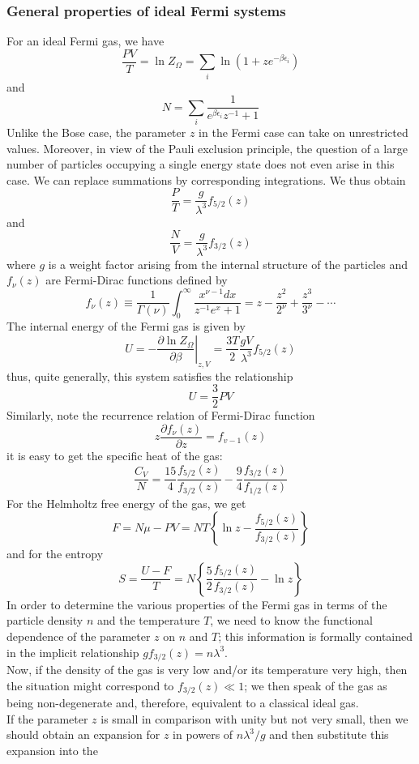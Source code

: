 \documentclass[cyan]{elegantnote}
\begin{document}
\subsubsection{General properties of ideal Fermi systems}
For an ideal Fermi gas, we have
\[\frac{PV}{T} = \ln Z_{\Omega} = \sum_i \ln(1+ze^{-\beta\epsilon_i})\]
and
\[N = \sum_i \frac{1}{e^{\beta\epsilon_i}z^{-1} + 1}\]
Unlike the Bose case, the parameter $z$ in the Fermi case can take on unrestricted values. Moreover, in view of the Pauli exclusion principle, the question of a large number of particles occupying a single energy state does not even arise in this case.  We can replace summations by corresponding integrations. We thus obtain
\[\frac{P}{T} = \frac{g}{\lambda^3}f_{5/2}(z)\]
and
\[\frac{N}{V} =  \frac{g}{\lambda^3}f_{3/2}(z)\]
where $g$ is a weight factor arising from the internal structure of the particles and $f_{\nu}(z)$ are Fermi-Dirac functions defined by
\[f_{\nu}(z) \equiv \frac{1}{\Gamma(\nu)} \int_{0}^{\infty} \frac{x^{\nu-1}dx}{z^{-1}e^x + 1} = z - \frac{z^2}{2^{\nu}} + \frac{z^3}{3^{\nu}} - \cdots\]
The internal energy of the Fermi gas is given by
\[U = - \left. \frac{\partial \ln Z_{\Omega}}{\partial \beta} \right|_{z,V} = \frac{3T}{2} \frac{gV}{\lambda^3} f_{5/2}(z)\]
thus, quite generally, this system satisfies the relationship
\[U = \frac{3}{2}PV\]
Similarly, note the recurrence relation of Fermi-Dirac function
\[z\frac{\partial f_{\nu}(z)}{\partial z} = f_{v-1}(z)\]
it is easy to get the specific heat of the gas:
\[\frac{C_V}{N} = \frac{15}{4} \frac{f_{5/2}(z)}{f_{3/2}(z)} -\frac{9}{4} \frac{f_{3/2}(z)}{f_{1/2}(z)}\]
For the Helmholtz free energy of the gas, we get
\[F = N\mu - PV = NT \left\{ \ln z - \frac{f_{5/2}(z)}{f_{3/2}(z)} \right\}\]
and for the entropy
\[S = \frac{U-F}{T} = N \left\{ \frac{5}{2} \frac{f_{5/2}(z)}{f_{3/2}(z)} - \ln z \right\}\]
In order to determine the various properties of the Fermi gas in terms of the particle density $n$ and the temperature $T$, we need to know the functional dependence of the parameter $z$ on $n$ and $T$; this information is formally contained in the implicit relationship $g f_{3/2}(z) = n\lambda^3$. 
\\
Now, if the density of the gas is very low and/or its temperature very high, then the situation might correspond to $f_{3/2}(z) \ll 1$; we then speak of the gas as being non-degenerate and, therefore, equivalent to a classical ideal gas.
\\
If the parameter $z$ is small in comparison with unity but not very small, then we should obtain an expansion for $z$ in powers of $n\lambda^3/g$ and then substitute this expansion into the
\end{document}
